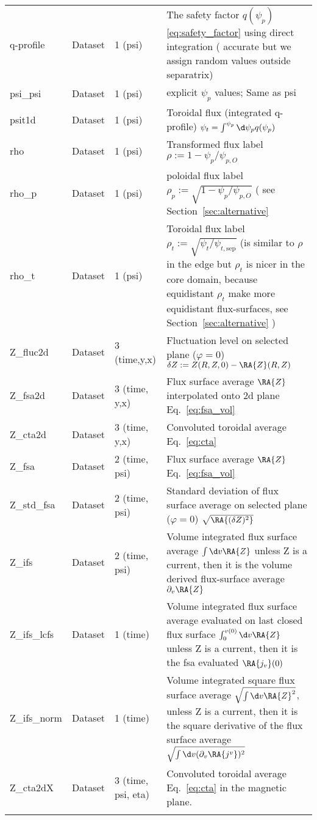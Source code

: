 \begin{longtable}{lll>{\RaggedRight}p{7cm}}
q-profile        & Dataset & 1 (psi) & The safety factor $q(\psi_p)$ \eqref{eq:safety_factor} using direct integration ( accurate but we assign random values outside separatrix) \\
psi\_psi         & Dataset & 1 (psi) & explicit $\psi_p$ values; Same as psi \\
psit1d           & Dataset & 1 (psi) & Toroidal flux (integrated q-profile) $\psi_t = \int^{\psi_p} \d\psi_p q(\psi_p)$ \\
rho              & Dataset & 1 (psi) & Transformed flux label $\rho:= 1 - \psi_p/\psi_{p,O}$ \\
rho\_p           & Dataset & 1 (psi) & poloidal flux label $\rho_p:= \sqrt{1 - \psi_p/\psi_{p,O}}$  ( see Section~\ref{sec:alternative}\\
    rho\_t           & Dataset & 1 (psi) & Toroidal flux label $\rho_t :=
    \sqrt{\psi_t/\psi_{t,\mathrm{sep}}}$ (is similar to $\rho$ in the edge but
    $\rho_t$ is nicer in the core domain, because equidistant $\rho_t$ make
more equidistant flux-surfaces, see Section~\ref{sec:alternative} )\\
Z\_fluc2d        & Dataset & 3 (time,y,x) & Fluctuation level on selected plane ($\varphi= 0$) $\delta Z := Z(R,Z,0) - \RA{ Z}(R,Z)$ \\
Z\_fsa2d         & Dataset & 3 (time, y,x) & Flux surface average $\RA{ Z}$ interpolated onto 2d plane Eq.~\eqref{eq:fsa_vol} \\
Z\_cta2d         & Dataset & 3 (time, y,x) & Convoluted toroidal average Eq.~\eqref{eq:cta} \\
Z\_fsa           & Dataset & 2 (time, psi) & Flux surface average $\RA{ Z}$ Eq.~\eqref{eq:fsa_vol} \\
Z\_std\_fsa      & Dataset & 2 (time, psi) & Standard deviation of flux surface average on selected plane ($\varphi=0$) $\sqrt{\RA{(\delta Z)^2}}$ \\
Z\_ifs           & Dataset & 2 (time, psi) & Volume integrated flux surface average $\int\d v\RA{ Z}$ unless Z is a current, then it is the volume derived flux-surface average $\partial_v \RA{ Z}$ \\
Z\_ifs\_lcfs     & Dataset & 1 (time) & Volume integrated flux surface average evaluated on last closed flux surface $\int_0^{v(0)}\d v\RA{ Z}$ unless Z is a current, then it is the fsa evaluated $\RA{ j_v}(0)$ \\
Z\_ifs\_norm     & Dataset & 1 (time) & Volume integrated square flux surface average $\sqrt{\int \d v \RA{Z}^2}$, unless Z is a current, then it is the square derivative of the flux surface average $\sqrt{\int\d v (\partial_v \RA{j^v})^2}$\\
Z\_cta2dX  & Dataset & 3 (time, psi, eta) & Convoluted toroidal average Eq.~\eqref{eq:cta} in the magnetic plane. \\
\bottomrule
\label{table:diag}
\end{longtable}
